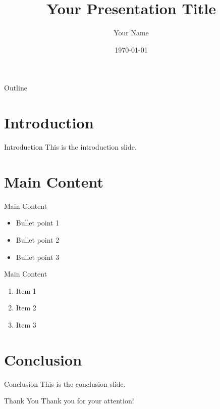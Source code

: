\documentclass{beamer}
\title{Your Presentation Title}
\author{Your Name}
\date{\today}
\newcommand{\mydiv}[4]{
  \divider{#1}{#2} (#1-rh.n) node[above] {$#3$}
  (#1-rl.n) node[right] {$#4$} (#1-out)
}
\begin{document}
\begin{frame}
  \titlepage
\end{frame}

\begin{frame}{Outline}
  \tableofcontents
\end{frame}

\section{Introduction}

\begin{frame}{Introduction}
  This is the introduction slide.


\end{frame}

\section{Main Content}

\begin{frame}{Main Content}
  \begin{itemize}
    \item Bullet point 1
    \item Bullet point 2
    \item Bullet point 3
  \end{itemize}
\end{frame}

\begin{frame}{Main Content}
  \begin{enumerate}
    \item Item 1
    \item Item 2
    \item Item 3
  \end{enumerate}
\end{frame}

\section{Conclusion}

\begin{frame}{Conclusion}
  This is the conclusion slide.
\end{frame}

\begin{frame}{Thank You}
  \centering
  \Huge Thank you for your attention!
\end{frame}
\end{document}
